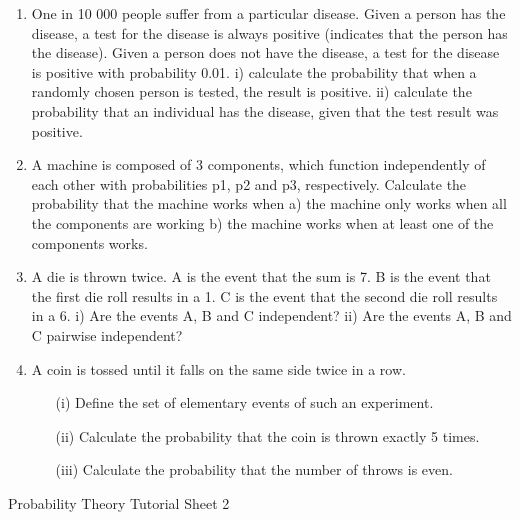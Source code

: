 \documentclass[]{report}
\begin{document}
\begin{enumerate}
	\item One in 10 000 people suffer from a particular disease. Given a person has the disease, a test for the disease is always positive (indicates that the person has the disease). Given a person does not have the disease, a test for the disease is positive with probability 0.01.
	i) calculate the probability that when a randomly chosen person is tested, the result is positive. 
	ii) calculate the probability that an individual has the disease, given that the test result was positive.
	
	\item A machine is composed of 3 components, which function independently of each other with probabilities p1, p2 and p3, respectively. Calculate the probability that the machine works when
	a)	the machine only works when all the components are working
	b)	the machine works when at least one of the components works.
	
	\item  A die is thrown twice. A is the event that the sum is 7. B is the event that the first die roll results in a 1. C is the event that the second die roll results in a 6. 
	i)	Are the events A, B and C independent?
	ii)	Are the events A, B and C pairwise independent?
\item A coin is tossed until it falls on the same side twice in a row.
\begin{itemize}
	\item[(i)] Define the set of elementary events of such an experiment.
	\item[(ii)]  Calculate the probability that the coin is thrown exactly 5 times.
	\item[(iii)]  Calculate the probability that the number of throws is even.
\end{itemize}
	
\end{enumerate}	
	
\newpage	
	
 
	
	
	
	Probability Theory 
	Tutorial Sheet 2
\end{document}
